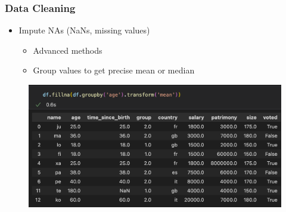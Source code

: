\begin{frame}\frametitle{Data Cleaning}
   \begin{itemize}
      \item Impute NAs (NaNs, missing values)
      \begin{itemize}
         \item Advanced methods
         \item Group values to get precise mean or median
      \end{itemize}
   \end{itemize}
   \vspace{.5cm}
   \begin{minipage}{0.58\linewidth}
      \begin{figure}[H]
         \includegraphics[scale=.35]{../images/illustrations/data_cleaning_na_imputation_group_by_3.png}
      \end{figure}
   \end{minipage}
\end{frame}


